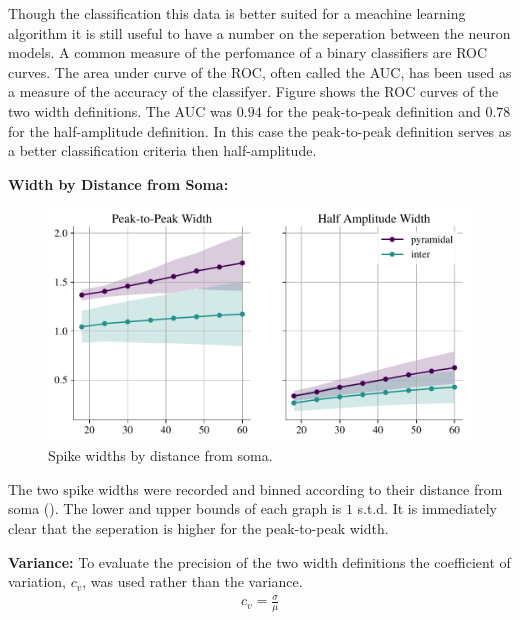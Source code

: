 \documentclass[altfont, fleqn]{uiophd}
\renewcommand{\cref}[1]{{\color{viridis_03}\mycref{#1}}}
\begin{document}
Though the classification this data is better suited for a
meachine learning algorithm 
it is still useful to have a number on the seperation 
between the neuron models. 
A common measure of the perfomance of a binary classifiers
are ROC curves. 
The area under curve of the ROC, often called the AUC, 
has been used as a measure 
of the accuracy of the classifyer. 
Figure \cref{fig:4_roc_curves}
shows the ROC curves of the two width definitions. 
The AUC was
$0.94$
for the peak-to-peak definition and 
$0.78$
for the half-amplitude 
definition. 
In this case the peak-to-peak definition serves as a better
classification criteria then half-amplitude.
\newline

\noindent
\textbf{Width by Distance from Soma:}

\begin{figure}[h]
    \begin{center}
        \includegraphics[width=\textwidth]{images/sec_4/int_pyr_widths_dist.pdf}
        \caption{
            Spike widths by distance from soma. 
        }
        \label{fig:4_2_width}
    \end{center}
\end{figure}

The two spike widths were recorded and binned according 
to their distance from soma
(\cref{fig:4_2_width}).
The lower and upper bounds of each graph is 
$1$ s.t.d.
It is immediately clear that the seperation 
is higher for the peak-to-peak width. 
\newline

\noindent
\textbf{Variance:}
To evaluate the precision of the two width definitions
the coefficient of variation, $c_v$,
was used rather than the variance. 
\begin{align}
    c_v = \frac{\sigma}{\mu}
\end{align}
\end{document}
